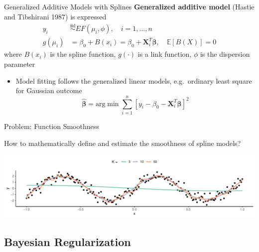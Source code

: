 \documentclass[
  ignorenonframetext,
  aspectratio=169]{beamer}
\providecommand{\tightlist}{%
  \setlength{\itemsep}{0pt}\setlength{\parskip}{0pt}}
\newcommand{\bs}[1]{\boldsymbol{#1}}
\newcommand{\simiid}{\overset{\text{iid}}{\sim}}
\begin{document}
\begin{frame}{Generalized Additive Models with Splines}
\protect\hypertarget{generalized-additive-models-with-splines}{}
\textbf{Generalized additive model} (Hastie and Tibshirani 1987) is
expressed \begin{align*}
  y_i &\simiid EF(\mu_i, \phi), \quad i = 1, \dots, n\\
  g(\mu_i) &= \beta_0 + B(x_i) = \beta_0 + \bs X_i^T \bs \beta ,  \quad \mathbb{E}\left[B(X)\right] = 0 
\end{align*} where \(B(x_i)\) is the spline function, \(g(\cdot)\) is a
link function, \(\phi\) is the dispersion parameter

\vspace*{0.2cm}

\begin{itemize}
\tightlist
\item
  Model fitting follows the generalized linear models, e.g.~ordinary
  least square for Gaussian outcome \[
  \boldsymbol{\hat \beta} = \text{arg}\min \sum\limits^n_{i=1} \left[y_i - \beta_0 - \bs X_i^T \bs \beta \right]^2
  \]
\end{itemize}
\end{frame}

\begin{frame}{Problem: Function Smoothness}
\protect\hypertarget{problem-function-smoothness}{}
\begin{tcolorbox}[colback=green!5,colframe=green!40!black,title=Question]
How to mathematically define and estimate the smoothness of spline models?
\end{tcolorbox}

\includegraphics{phd_defense_slides_files/figure-beamer/spline_overfitting-1.pdf}
\end{frame}

\hypertarget{bayesian-regularization}{%
\subsection{Bayesian Regularization}\label{bayesian-regularization}}
\end{document}
